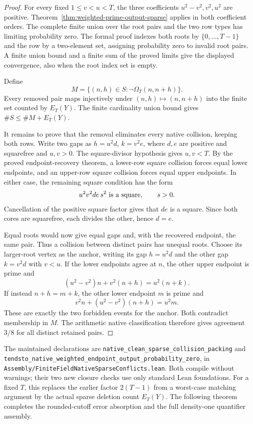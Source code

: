 \documentclass[11pt]{article}
\begin{document}
\begin{proof}
For every fixed \(1\le v<u<T\), the three coefficients
\(u^2-v^2,v^2,u^2\) are positive.
Theorem~\ref{thm:weighted-prime-output-sparse} applies in both
coefficient orders. The complete finite union over the root
pairs and the two row types has limiting probability zero.
The formal proof indexes both roots by \(\{0,\ldots,T-1\}\)
and the row by a two-element set, assigning probability zero
to invalid root pairs. A finite union bound and a finite sum
of the proved limits give the displayed convergence, also
when the root index set is empty.

Define
\[
 M=\{(n,h)\in S:\neg\Omega_T(n,n+h)\}.
\]
Every removed pair maps injectively under
\((n,h)\mapsto(n,n+h)\) into the finite set counted by \(E_T(Y)\).
The finite cardinality union bound gives \(\#S\le\#M+E_T(Y)\).

It remains to prove that the removal eliminates every native
collision, keeping both rows. Write two gaps as
\(h=u^2d\), \(k=v^2e\), where \(d,e\) are positive and
squarefree and \(u,v>0\). The square-divisor hypothesis gives
\(u,v<T\). By the proved endpoint-recovery theorem, a lower-row
square collision forces equal lower endpoints, and an upper-row
square collision forces equal upper endpoints. In either case,
the remaining square condition has the form
\[
 u^2v^2de\,s^2\ \hbox{is a square},\qquad s>0.
\]
Cancellation of the positive square factor gives that \(de\)
is a square. Since both cores are squarefree, each divides
the other, hence \(d=e\).

Equal roots would now give equal gaps and, with the recovered
endpoint, the same pair. Thus a collision between distinct
pairs has unequal roots. Choose its larger-root vertex as the
anchor, writing its gap \(h=u^2d\) and the other gap \(k=v^2d\)
with \(v<u\). If the lower endpoints agree at \(n\), the other
upper endpoint is prime and
\[
 (u^2-v^2)n+v^2(n+h)=u^2(n+k).
\]
If instead \(n+h=m+k\), the other lower endpoint \(m\) is prime
and
\[
 v^2n+(u^2-v^2)(n+h)=u^2m.
\]
These are exactly the two forbidden events for the anchor.
Both contradict membership in \(M\). The arithmetic native
classification therefore gives agreement \(3/8\) for all
distinct retained pairs.
\end{proof}

The maintained declarations are
\texttt{native\_clean\_sparse\_collision\_packing} and
\texttt{tendsto\_native\_weighted\_endpoint\_output\_probability\_zero},
in \texttt{Assembly/\allowbreak FiniteFieldNativeSparseConflicts.\allowbreak lean}.
Both compile without warnings; their two new closure checks
use only standard Lean foundations.
For a fixed \(T\), this replaces the earlier factor
\(2(T-1)\) from a worst-case matching argument by the actual
sparse deletion count \(E_T(Y)\).
The following theorem completes the rounded-cutoff error absorption
and the full density-one quantifier assembly.
\end{document}
